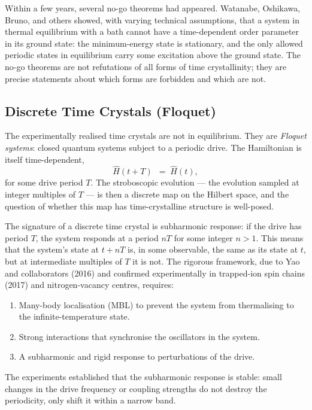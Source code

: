 \documentclass[11pt]{article}
\begin{document}
Within a few years, several no-go theorems had appeared. Watanabe, Oshikawa, Bruno, and others showed, with varying technical assumptions, that a system in thermal equilibrium with a bath cannot have a time-dependent order parameter in its ground state: the minimum-energy state is stationary, and the only allowed periodic states in equilibrium carry some excitation above the ground state. The no-go theorems are not refutations of all forms of time crystallinity; they are precise statements about which forms are forbidden and which are not.

\subsection{Discrete Time Crystals (Floquet)}

The experimentally realised time crystals are not in equilibrium. They are \emph{Floquet systems}: closed quantum systems subject to a periodic drive. The Hamiltonian is itself time-dependent,
\begin{equation}
\hat{H}(t + T) \;\:=\; \hat{H}(t),
\label{eq:floquet}
\end{equation}
for some drive period $T$. The stroboscopic evolution --- the evolution sampled at integer multiples of $T$ --- is then a discrete map on the Hilbert space, and the question of whether this map has time-crystalline structure is well-posed.

The signature of a discrete time crystal is subharmonic response: if the drive has period $T$, the system responds at a period $nT$ for some integer $n > 1$. This means that the system's state at $t + nT$ is, in some observable, the same as its state at $t$, but at intermediate multiples of $T$ it is not. The rigorous framework, due to Yao and collaborators (2016) and confirmed experimentally in trapped-ion spin chains (2017) and nitrogen-vacancy centres, requires:
\begin{enumerate}
    \item Many-body localisation (MBL) to prevent the system from thermalising to the infinite-temperature state.
    \item Strong interactions that synchronise the oscillators in the system.
    \item A subharmonic and rigid response to perturbations of the drive.
\end{enumerate}
The experiments established that the subharmonic response is stable: small changes in the drive frequency or coupling strengths do not destroy the periodicity, only shift it within a narrow band.
\end{document}

